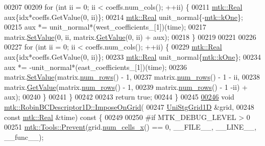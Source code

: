 \begin{DoxyCode}
00207 
00209     \textcolor{keywordflow}{for} (\textcolor{keywordtype}{int} ii = 0; ii < coeffs.num\_cols(); ++ii) \{
00211       \hyperlink{group__c01-roots_gac080bbbf5cbb5502c9f00405f894857d}{mtk::Real} aux\{idx*coeffs.GetValue(0, ii)\};
00214       \hyperlink{group__c01-roots_gac080bbbf5cbb5502c9f00405f894857d}{mtk::Real} unit\_normal\{-\hyperlink{group__c01-roots_ga26407c24d43b6b95480943340d285c71}{mtk::kOne}\};
00215       aux *= unit\_normal*(west\_coefficients\_[1])(time);
00217       matrix.\hyperlink{classmtk_1_1DenseMatrix_a784ce5784109ac86bfb9d8562b334b13}{SetValue}(0, ii, matrix.\hyperlink{classmtk_1_1DenseMatrix_a4b23ecbebd970b5eea915dbb50691024}{GetValue}(0, ii) + aux);
00218     \}
00219 
00221 
00226 
00227     \textcolor{keywordflow}{for} (\textcolor{keywordtype}{int} ii = 0; ii < coeffs.num\_cols(); ++ii) \{
00229       \hyperlink{group__c01-roots_gac080bbbf5cbb5502c9f00405f894857d}{mtk::Real} aux\{idx*coeffs.GetValue(0, ii)\};
00233       \hyperlink{group__c01-roots_gac080bbbf5cbb5502c9f00405f894857d}{mtk::Real} unit\_normal\{\hyperlink{group__c01-roots_ga26407c24d43b6b95480943340d285c71}{mtk::kOne}\};
00234       aux *= -unit\_normal*(east\_coefficients\_[1])(time);
00236       matrix.\hyperlink{classmtk_1_1DenseMatrix_a784ce5784109ac86bfb9d8562b334b13}{SetValue}(matrix.\hyperlink{classmtk_1_1DenseMatrix_a53f3afb3b6a8d21854458aaa9663cc74}{num\_rows}() - 1,
00237                       matrix.\hyperlink{classmtk_1_1DenseMatrix_a53f3afb3b6a8d21854458aaa9663cc74}{num\_rows}() - 1 - ii,
00238                       matrix.\hyperlink{classmtk_1_1DenseMatrix_a4b23ecbebd970b5eea915dbb50691024}{GetValue}(matrix.\hyperlink{classmtk_1_1DenseMatrix_a53f3afb3b6a8d21854458aaa9663cc74}{num\_rows}() - 1,
00239                                       matrix.\hyperlink{classmtk_1_1DenseMatrix_a53f3afb3b6a8d21854458aaa9663cc74}{num\_rows}() - 1 -ii) + aux);
00240     \}
00241   \}
00242 
00243   \textcolor{keywordflow}{return} \textcolor{keyword}{true};
00244 \}
00245 
\hypertarget{mtk__robin__bc__descriptor__1d_8cc_source_l00246}{}\hyperlink{classmtk_1_1RobinBCDescriptor1D_ab0daec1d6c5c9c6768bea08281a3831d}{00246} \textcolor{keywordtype}{void} \hyperlink{classmtk_1_1RobinBCDescriptor1D_ab0daec1d6c5c9c6768bea08281a3831d}{mtk::RobinBCDescriptor1D::ImposeOnGrid}(
00247     \hyperlink{classmtk_1_1UniStgGrid1D}{UniStgGrid1D} &grid,
00248     \textcolor{keyword}{const} \hyperlink{group__c01-roots_gac080bbbf5cbb5502c9f00405f894857d}{mtk::Real} &time)\textcolor{keyword}{ const }\{
00249 
00250 \textcolor{preprocessor}{  #if MTK\_DEBUG\_LEVEL > 0}
00251   \hyperlink{classmtk_1_1Tools_a332324c6f25e66be9dff48c5987a3b9f}{mtk::Tools::Prevent}(grid.\hyperlink{classmtk_1_1UniStgGrid1D_af1b3729d8afa07be5b2775ed68015b80}{num\_cells\_x}() == 0, \_\_FILE\_\_, \_\_LINE\_\_, \_\_func\_\_);

\end{DoxyCode}
